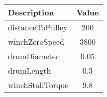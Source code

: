        \begin{center}

            \begin{tabular}{|l|c|}

               \hline

Description & Value  \\ \hline \hline 

distanceToPulley & 200 \\ \hline 

winchZeroSpeed & 3800 \\ \hline 

drumDiameter & 0.05 \\ \hline 

drumLength & 0.3 \\ \hline 

winchStallTorque & 9.8 \\ \hline 

            \end{tabular}

        \end{center}


